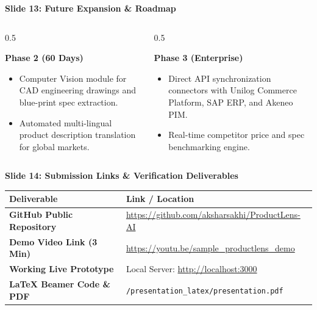 \documentclass[aspectratio=169, 10pt]{beamer}
\begin{document}
\begin{frame}{\textbf{Slide 13: Future Expansion \& Roadmap}}
  \begin{columns}
    \begin{column}{0.5\textwidth}
      \begin{block}{\textbf{Phase 2 (60 Days)}}
        \begin{itemize}
          \item Computer Vision module for CAD engineering drawings and blue-print spec extraction.
          \item Automated multi-lingual product description translation for global markets.
        \end{itemize}
      \end{block}
    \end{column}

    \begin{column}{0.5\textwidth}
      \begin{block}{\textbf{Phase 3 (Enterprise)}}
        \begin{itemize}
          \item Direct API synchronization connectors with Unilog Commerce Platform, SAP ERP, and Akeneo PIM.
          \item Real-time competitor price and spec benchmarking engine.
        \end{itemize}
      \end{block}
    \end{column}
  \end{columns}
\end{frame}

\begin{frame}{\textbf{Slide 14: Submission Links \& Verification Deliverables}}
  \begin{center}
    \small
    \begin{tabular}{p{4.5cm} p{8cm}}
      \toprule
      \textbf{Deliverable} & \textbf{Link / Location} \\
      \midrule
      \textbf{GitHub Public Repository} & \url{https://github.com/aksharsakhi/ProductLens-AI} \\
      \rowcolor{gray!10}
      \textbf{Demo Video Link (3 Min)} & \url{https://youtu.be/sample_productlens_demo} \\
      \textbf{Working Live Prototype} & Local Server: \url{http://localhost:3000} \\
      \rowcolor{gray!10}
      \textbf{LaTeX Beamer Code \& PDF} & \texttt{/presentation\_latex/presentation.pdf} \\
      \bottomrule
    \end{tabular}
  \end{center}
\end{frame}
\end{document}
